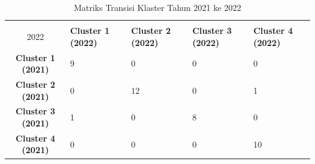\begin{table}[H]
\centering
\caption{Matriks Transisi Klaster Tahun 2021 ke 2022} \label{tab:transisi_2021_2022}
\begin{tabular}{|c|p{2cm}|p{2cm}|p{2cm}|p{2cm}|}
\hline
\textbf{Tahun 2021 \\ 2022} & \textbf{Cluster 1 (2022)} & \textbf{Cluster 2 (2022)} & \textbf{Cluster 3 (2022)} & \textbf{Cluster 4 (2022)} \\ \hline
\textbf{Cluster 1 (2021)} & 9 & 0 & 0 & 0 \\ \hline
\textbf{Cluster 2 (2021)} & 0 & 12 & 0 & 1 \\ \hline
\textbf{Cluster 3 (2021)} & 1 & 0 & 8 & 0 \\ \hline
\textbf{Cluster 4 (2021)} & 0 & 0 & 0 & 10 \\ \hline
\end{tabular}
\end{table}